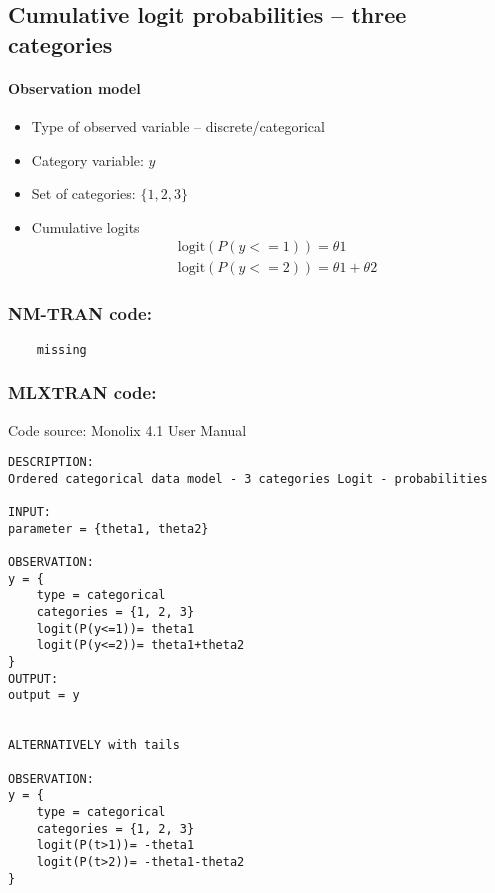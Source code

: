 \subsection{Cumulative logit probabilities -- three categories}

\paragraph{Observation model}

\begin{itemize}
\item
Type of observed variable -- discrete/categorical
\item
Category variable: $y$
\item
Set of categories: $\{1,2,3\}$
\item
Cumulative logits
\begin{align}
& \text{logit}(P(y<=1) )= \theta1  \nonumber \\
& \text{logit}(P(y<=2) )= \theta1+ \theta2  \nonumber 
\end{align}
\end{itemize}


\subsubsection{NM-TRAN code:}

\myStartLine

\lstset{language=NONMEMdataSet}
\begin{lstlisting}
	missing
\end{lstlisting}

\myEndLine

\subsubsection{MLXTRAN code:}
Code source: Monolix 4.1 User Manual

\myStartLine

\lstset{language=MLXTRANcode}
\begin{lstlisting}
DESCRIPTION:
Ordered categorical data model - 3 categories Logit - probabilities

INPUT:
parameter = {theta1, theta2}

OBSERVATION:
y = {
	type = categorical 
	categories = {1, 2, 3} 
	logit(P(y<=1))= theta1 
	logit(P(y<=2))= theta1+theta2
}
OUTPUT:
output = y


ALTERNATIVELY with tails

OBSERVATION:
y = { 
	type = categorical 
	categories = {1, 2, 3} 
	logit(P(t>1))= -theta1 
	logit(P(t>2))= -theta1-theta2
}
\end{lstlisting}

